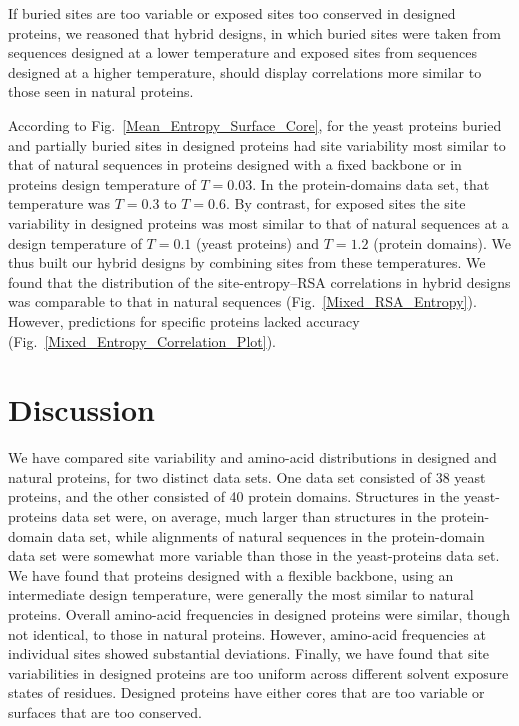 \documentclass[12pt]{article}
\begin{document}
If buried sites are too variable or exposed sites too conserved in designed proteins, we reasoned that hybrid designs, in which buried sites were taken from sequences designed at a lower temperature and exposed sites from sequences designed at a higher temperature, should display correlations more similar to those seen in natural proteins. 

According to Fig.~\ref{Mean_Entropy_Surface_Core}, for the yeast proteins buried and partially buried sites in designed proteins had site variability most similar to that of natural sequences in proteins designed with a fixed backbone or in proteins design temperature of $T=0.03$. In the protein-domains data set, that temperature was $T=0.3$ to $T = 0.6$.  By contrast, for exposed sites the site variability in designed proteins was most similar to that of natural sequences at a design temperature of $T= 0.1$ (yeast proteins) and $T  = 1.2$ (protein domains).  We thus built our hybrid designs by combining sites from these temperatures. We found that the distribution of the site-entropy--RSA correlations in hybrid designs was comparable to that in natural sequences (Fig.~\ref{Mixed_RSA_Entropy}). However, predictions for specific proteins lacked accuracy (Fig.~\ref{Mixed_Entropy_Correlation_Plot}).


\section{Discussion}

We have compared site variability and amino-acid distributions in designed and natural proteins, for two distinct data sets. One data set consisted of 38 yeast proteins, and the other consisted of 40 protein domains. Structures in the yeast-proteins data set were, on average, much larger than structures in the protein-domain data set, while alignments of natural sequences in the protein-domain data set were somewhat more variable than those in the yeast-proteins data set. We have found that proteins designed with a flexible backbone, using an intermediate design temperature, were generally the most similar to natural proteins. Overall amino-acid frequencies in designed proteins were similar, though not identical, to those in natural proteins. However, amino-acid frequencies at individual sites showed substantial deviations. Finally, we have found that site variabilities in designed proteins are too uniform across different solvent exposure states of residues. Designed proteins have either cores that are too variable or surfaces that are too conserved.
\end{document}

